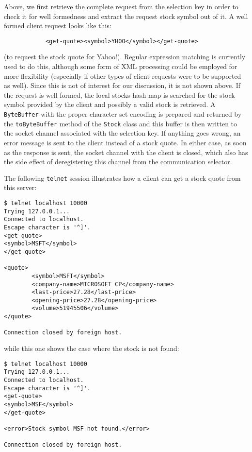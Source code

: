 \documentclass[a4paper,10pt]{article}
\begin{document}
Above, we first retrieve the complete request from the selection key in order to check it for well formedness
and extract the request stock symbol out of it. A well formed client request looks like this:
\begin{verbatim}
            <get-quote><symbol>YHOO</symbol></get-quote>
\end{verbatim}
(to request the stock quote for Yahoo!). Regular expression matching is currently used to do this, although
some form of XML processing could be employed for more flexibility (especially if other types of client requests were
to be supported as well). Since this is not of interest for our discussion, it is not shown above. If the request
is well formed, the local stocks hash map is searched for the stock symbol provided by the client and possibly a valid stock
is retrieved. A \texttt{ByteBuffer} with the proper character set encoding is prepared and returned by the
\texttt{toByteBuffer} method of the \texttt{Stock} class and this buffer is then written to the socket channel
associated with the selection key. If anything goes wrong, an error message is sent to the client instead of
a stock quote. In either case, as soon as the response is sent, the socket channel with the client is closed, which
also has the side effect of deregistering this channel from the communication selector.

The following \texttt{telnet} session illustrates how a client can get a stock quote from this server:

\begin{verbatim}
$ telnet localhost 10000
Trying 127.0.0.1...
Connected to localhost.
Escape character is '^]'.
<get-quote>
<symbol>MSFT</symbol>
</get-quote>

<quote>
        <symbol>MSFT</symbol>
        <company-name>MICROSOFT CP</company-name>
        <last-price>27.28</last-price>
        <opening-price>27.28</opening-price>
        <volume>51945506</volume>
</quote>

Connection closed by foreign host.
\end{verbatim}

while this one shows the case where the stock is not found:

\begin{verbatim}
$ telnet localhost 10000
Trying 127.0.0.1...
Connected to localhost.
Escape character is '^]'.
<get-quote>
<symbol>MSF</symbol>
</get-quote>

<error>Stock symbol MSF not found.</error>

Connection closed by foreign host.
\end{verbatim}
\end{document}
